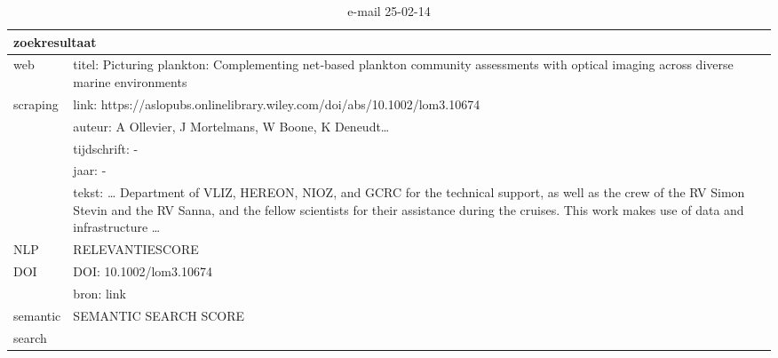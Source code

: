 \begin{table}[h!]
    \caption{e-mail 25-02-14}
    \centering
    \begin{tabularx}{\textwidth}{|p{4cm}|X|} 
        \hline
        \multicolumn{2}{|X|}{\textbf{zoekresultaat}} \\
        \hline
        web &titel: Picturing plankton: Complementing net‐based plankton community assessments with optical imaging across diverse marine environments\\
        scraping&link: https://aslopubs.onlinelibrary.wiley.com/doi/abs/10.1002/lom3.10674\\
        &auteur: A Ollevier, J Mortelmans, W Boone, K Deneudt…\\
        &tijdschrift: -\\
        &jaar: -\\
        &tekst: … Department of VLIZ, HEREON, NIOZ, and GCRC for the technical support, as well as the crew of the RV Simon Stevin and the RV Sanna, and the fellow scientists for their assistance during the cruises. This work makes use of data and infrastructure …\\
        \hline
        NLP&RELEVANTIESCORE\\
        \hline
        DOI&DOI: 10.1002/lom3.10674\\
        &bron: link\\
        \hline
        semantic&SEMANTIC SEARCH SCORE\\
        search&\\
        \hline
    \end{tabularx}
    \label{table:email20250214}
\end{table}
